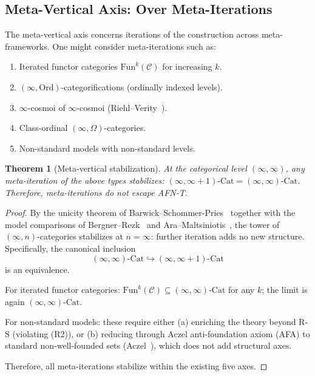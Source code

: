 \documentclass[11pt]{article}
\theoremstyle{plain}
\newtheorem{theorem}{Theorem}[section]
\theoremstyle{definition}
\newcommand{\cC}{\mathcal{C}}
\newcommand{\Fun}{\mathrm{Fun}}
\newcommand{\Cat}{\mathrm{Cat}}
\begin{document}
\subsection{Meta-Vertical Axis: Over Meta-Iterations}

The meta-vertical axis concerns iterations of the construction across meta-frameworks. One might consider meta-iterations such as:
\begin{enumerate}
\item Iterated functor categories $\Fun^k(\cC)$ for increasing $k$.
\item $(\infty, \mathrm{Ord})$-categorifications (ordinally indexed levels).
\item $\infty$-cosmoi of $\infty$-cosmoi (Riehl--Verity~\cite{RiehlVerity2022}).
\item Class-ordinal $(\infty, \Omega)$-categories.
\item Non-standard models with non-standard levels.
\end{enumerate}

\begin{theorem}[Meta-vertical stabilization]\label{thm:meta-vertical}
At the categorical level $(\infty, \infty)$, any meta-iteration of the above types stabilizes: $(\infty, \infty + 1)\text{-}\Cat = (\infty, \infty)\text{-}\Cat$. Therefore, meta-iterations do not escape AFN-T.
\end{theorem}

\begin{proof}
By the unicity theorem of Barwick--Schommer-Pries~\cite{BarwickSchommerPries2021} together with the model comparisons of Bergner--Rezk~\cite{BergnerRezk2013} and Ara--Maltsiniotis~\cite{AraMaltsiniotis2017}, the tower of $(\infty, n)$-categories stabilizes at $n = \infty$: further iteration adds no new structure. Specifically, the canonical inclusion
\[ (\infty, \infty)\text{-}\Cat \hookrightarrow (\infty, \infty + 1)\text{-}\Cat \]
is an equivalence.

For iterated functor categories: $\Fun^k(\cC) \subseteq (\infty, \infty)\text{-}\Cat$ for any $k$; the limit is again $(\infty, \infty)$-$\Cat$.

For non-standard models: these require either (a) enriching the theory beyond R-S (violating (R2)), or (b) reducing through Aczel anti-foundation axiom (AFA) to standard non-well-founded sets (Aczel~\cite{Aczel1988}), which does not add structural axes.

Therefore, all meta-iterations stabilize within the existing five axes.
\end{proof}
\end{document}

